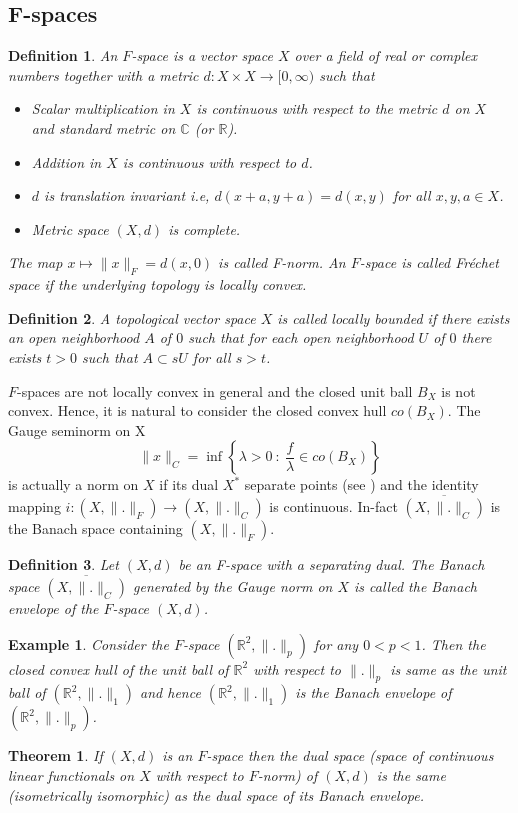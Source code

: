 \documentclass[pdflatex,sn-mathphys-num]{sn-jnl}%
\newtheorem{definition}{Definition}
\theoremstyle{thmstyleone}%
\newtheorem{theorem}{Theorem}%
\theoremstyle{thmstyletwo}%
\newtheorem{example}{Example}%
\theoremstyle{thmstylethree}%
\begin{document}
\subsection{F-spaces}
\begin{definition}
	An $F$-space is a vector space $X$ over a field of real or complex numbers together with a metric $d:X\times X\to \mathbb [0,\infty)$ such that \begin{itemize}
		\item Scalar multiplication in $X$ is continuous with respect to the metric $d$ on $X$ and standard metric on $\mathbb C$ (or $\mathbb R$).
		\item Addition in $X$ is continuous with respect to $d$.
		\item $d$ is translation invariant i.e, $d(x+a,y+a)=d(x,y)$ for all $x,y,a\in X$.
		\item  Metric space $(X,d)$ is complete.
	\end{itemize}
	The map $x\mapsto \|x\|_F=d(x,0)$ is called \emph{F-norm}. An $F$-space is called \emph{Fréchet space} if the underlying topology is locally convex.
\end{definition}
\begin{definition}
	A topological vector space $X$ is called locally bounded if there exists an open neighborhood $A$ of $0$ such that for each open neighborhood $U$ of $0$ there exists  $t>0$ such that $A\subset  sU$ for all $s>t$.
\end{definition}
$F$-spaces are not locally convex in general and the closed unit ball $B_X$ is not convex. Hence, it is natural to consider the closed convex hull $co(B_X)$. The Gauge seminorm on X
$$\|x\|_C=\inf\left\{\lambda>0~:~\frac{f}{\lambda}\in co(B_X)\right\}$$
is actually a norm on $X$ if its dual $X^*$ separate points (see \cite[Ch.2, sec. 4]{Kalton}) and the identity mapping $i:(X,\|.\|_F)\to (X,\|.\|_C)$ is continuous. In-fact $\overline{(X,\|.\|_C)}$ is the  Banach space containing $(X,\|.\|_F)$.
\begin{definition}
	Let $(X,d)$ be an F-space with a separating dual. The Banach space $\overline{(X,\|.\|_C)}$ generated by the Gauge norm on $X$ is called the Banach envelope of the $F$-space $(X,d)$.
\end{definition}
\begin{example}
	Consider the $F$-space $(\mathbb R^2,\|.\|_p)$ for any $0<p<1$. Then the closed convex hull of the unit ball of $\mathbb R^2$ with respect to $\|.\|_p$ is same as the unit ball of $(\mathbb R^2,\|.\|_1)$ and hence $(\mathbb R^2,\|.\|_1)$ is the Banach envelope of $(\mathbb R^2,\|.\|_p)$.
\end{example}
\begin{theorem}\cite[Ch.2 Sec. 4]{Kalton}
	If $(X,d)$ is an $F$-space then the dual space (space of continuous linear functionals on $X$ with respect to $F$-norm) of $(X,d)$ is the same (isometrically isomorphic) as the dual space of its Banach envelope.
\end{theorem}
\end{document}
